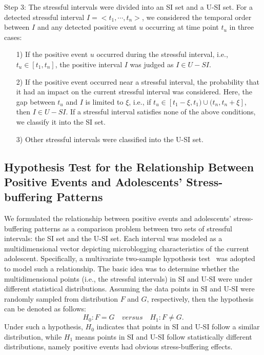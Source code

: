 Step 3: The stressful intervals were divided  into an SI set and a U-SI set. 
For a detected stressful interval $I = <t_1,\cdots,t_n>$, 
we considered the temporal order between $I$ and any detected positive event $u$ occurring at time point $t_u$ in three cases:
\begin{itemize} 
\item[1)] If the positive event $u$ occurred during the stressful interval, i.e., $t_u \in [t_1,t_n]$, 
the positive interval $I$ was judged as $I \in U-SI$.
\vspace{-0.3cm}
\item[2)] If the positive event occurred near a stressful interval, 
the probability that it had an impact on the current stressful interval was considered. 
Here, the gap between $t_u$ and $I$ is limited to $\xi$, i.e., 
if $t_u \in [t_{1}-\xi, t_1)\cup(t_{n},t_{n}+\xi]$, then $I \in U-SI$. 
If a stressful interval satisfies none of the above conditions, we classify it into the SI set.
\vspace{-0.3cm} 
\item[3)] Other stressful intervals were classified into the U-SI set. 
\end{itemize} 

\subsection{Hypothesis Test for the Relationship Between Positive Events and Adolescents' Stress-buffering Patterns}
\label{sec:frame2}
We formulated the relationship between positive events and adolescents' stress-buffering patterns
as a comparison problem between two sets of stressful intervals: the SI set and the U-SI set.
Each interval was modeled as a multidimensional vector depicting microblogging characteristics of the current adolescent.
Specifically, a multivariate two-sample hypothesis test~\citep{Li2017Correlating,Johnson2012Applied} was adopted to model such a relationship.
The basic idea was to determine whether the multidimensional points (i.e., the stressful intervals) 
in SI and U-SI were under different statistical distributions.
Assuming the data points in SI and U-SI were randomly sampled from distribution $F$ and $G$, respectively, 
then the hypothesis can be denoted as follows:
\begin{equation}
H_0: F = G \quad versus \quad H_1: F \neq G.
\end{equation}
Under such a hypothesis, 
$H_0$ indicates that points in SI and U-SI follow a similar distribution, 
while $H_1$ means points in SI and U-SI follow statistically different distributions, 
namely positive events had obvious stress-buffering effects. 

